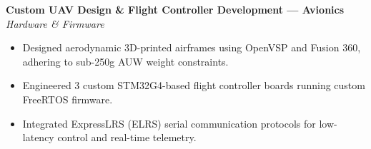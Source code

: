 \documentclass[10pt,a4paper]{article}
\begin{document}
\vspace{2pt}
\textbf{Custom UAV Design \& Flight Controller Development --- Avionics} \hfill \textit{Hardware \& Firmware}
\begin{itemize}
    \item Designed aerodynamic 3D-printed airframes using OpenVSP and Fusion 360, adhering to sub-250g AUW weight constraints.
    \item Engineered 3 custom STM32G4-based flight controller boards running custom FreeRTOS firmware.
    \item Integrated ExpressLRS (ELRS) serial communication protocols for low-latency control and real-time telemetry.
\end{itemize}
\end{document}

